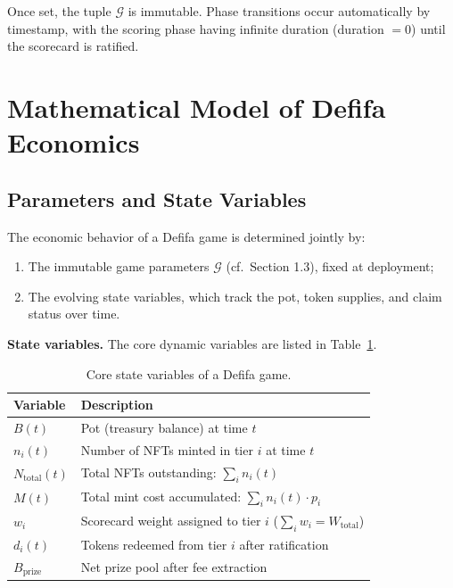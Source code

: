\documentclass[11pt,a4paper]{article}
\begin{document}
Once set, the tuple $\mathcal{G}$ is immutable. Phase transitions occur automatically by timestamp, with the scoring phase having infinite duration (duration $= 0$) until the scorecard is ratified.

\section{Mathematical Model of Defifa Economics}

\subsection{Parameters and State Variables}

The economic behavior of a Defifa game is determined jointly by:
\begin{enumerate}[nosep]
    \item The immutable game parameters $\mathcal{G}$ (cf.\ Section 1.3), fixed at deployment;
    \item The evolving state variables, which track the pot, token supplies, and claim status over time.
\end{enumerate}

\textbf{State variables.} The core dynamic variables are listed in Table~\ref{tab:state}.

\begin{table}[H]
\centering
\begin{tabular}{ll}
\toprule
\textbf{Variable} & \textbf{Description} \\
\midrule
$B(t)$ & Pot (treasury balance) at time $t$ \\
$n_i(t)$ & Number of NFTs minted in tier $i$ at time $t$ \\
$N_{\text{total}}(t)$ & Total NFTs outstanding: $\sum_i n_i(t)$ \\
$M(t)$ & Total mint cost accumulated: $\sum_i n_i(t) \cdot p_i$ \\
$w_i$ & Scorecard weight assigned to tier $i$ ($\sum_i w_i = W_{\text{total}}$) \\
$d_i(t)$ & Tokens redeemed from tier $i$ after ratification \\
$B_{\text{prize}}$ & Net prize pool after fee extraction \\
\bottomrule
\end{tabular}
\caption{Core state variables of a Defifa game.}
\label{tab:state}
\end{table}
\end{document}
